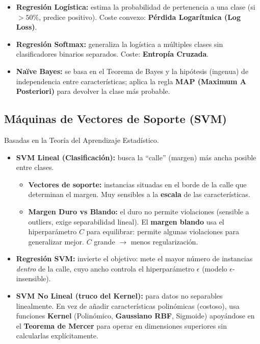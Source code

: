 \documentclass[12pt]{book} %
\providecommand{\tightlist}{%
  \setlength{\itemsep}{0pt}\setlength{\parskip}{0pt}}
\begin{document}
\begin{itemize}
\tightlist
\item
  \textbf{Regresión Logística:} estima la probabilidad de pertenencia a
  una clase (si \(>50\%\), predice positivo). Coste convexo:
  \textbf{Pérdida Logarítmica (Log Loss)}.
\item
  \textbf{Regresión Softmax:} generaliza la logística a múltiples clases
  sin clasificadores binarios separados. Coste: \textbf{Entropía
  Cruzada}.
\item
  \textbf{Naïve Bayes:} se basa en el Teorema de Bayes y la hipótesis
  (ingenua) de independencia entre características; aplica la regla
  \textbf{MAP (Maximum A Posteriori)} para devolver la clase más
  probable.
\end{itemize}

\hypertarget{muxe1quinas-de-vectores-de-soporte-svm}{%
\subsection{Máquinas de Vectores de Soporte
(SVM)}\label{muxe1quinas-de-vectores-de-soporte-svm}}

Basadas en la Teoría del Aprendizaje Estadístico.

\begin{itemize}
\tightlist
\item
  \textbf{SVM Lineal (Clasificación):} busca la ``calle'' (margen) más
  ancha posible entre clases.

  \begin{itemize}
  \tightlist
  \item
    \textbf{Vectores de soporte:} instancias situadas en el borde de la
    calle que determinan el margen. Muy sensibles a la \textbf{escala}
    de las características.
  \item
    \textbf{Margen Duro vs Blando:} el duro no permite violaciones
    (sensible a outliers, exige separabilidad lineal). El \textbf{margen
    blando} usa el hiperparámetro \(C\) para equilibrar: permite algunas
    violaciones para generalizar mejor. \(C\) grande \(\to\) menos
    regularización.
  \end{itemize}
\item
  \textbf{Regresión SVM:} invierte el objetivo: mete el mayor número de
  instancias \emph{dentro} de la calle, cuyo ancho controla el
  hiperparámetro \(\epsilon\) (modelo \(\epsilon\)-insensible).
\item
  \textbf{SVM No Lineal (truco del Kernel):} para datos no separables
  linealmente. En vez de añadir características polinómicas (costoso),
  usa funciones \textbf{Kernel} (Polinómico, \textbf{Gaussiano RBF},
  Sigmoide) apoyándose en el \textbf{Teorema de Mercer} para operar en
  dimensiones superiores sin calcularlas explícitamente.
\end{itemize}
\end{document}
